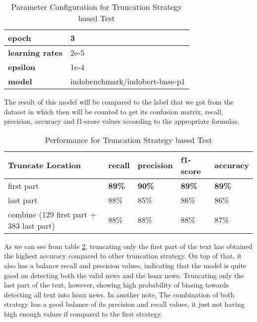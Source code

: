 \begin{table}[h]
  \caption{Parameter Configuration for Truncation Strategy based Test}
  \label{tab: truncate_param}
  \centering
  \begin{tabular}{|l|l|}
    \hline
    \textbf{epoch}          & 3                              \\ \hline
    \textbf{learning rates} & 2e-5                           \\ \hline
    \textbf{epsilon}        & 1e-4                           \\ \hline
    \textbf{model}          & indobenchmark/indobert-base-p1 \\ \hline
  \end{tabular}
\end{table}

The result of this model will be compared to the label that we got from the dataset in which then will be counted to get its confusion matrix, recall, precision, accuracy and f1-score values according to the appropriate formulas.

\begin{table}[h]
  \centering
  \caption{Performance for Truncation Strategy based Test}
  \label{tab: truncate_result}
  \begin{tabular}{|p{}|l|l|l|l|}
    \hline
    \textbf{Truncate Location}               & \textbf{recall} & \textbf{precision} & \textbf{f1-score} & \textbf{accuracy} \\ \hline
    first part                               & \textbf{89\%}   & \textbf{90\%}      & \textbf{89\%}     & \textbf{89\%}     \\ \hline
    last part                                & 88\%            & 85\%               & 86\%              & 86\%              \\ \hline
    combine (129 first part + 383 last part) & 88\%            & 88\%               & 88\%              & 87\%              \\ \hline
  \end{tabular}
\end{table}

As we can see from table \ref{tab: truncate_result}, truncating only the first part of the text has obtained the highest accuracy compared to other truncation strategy. On top of that, it also has a balance recall and precision values, indicating that the model is quite good on detecting both the valid news and the hoax news. Truncating only the last part of the text, however, showing high probability of biasing towards detecting all text into hoax news. In another note, The combination of both strategy has a good balance of its precision and recall values, it just not having high enough values if compared to the first strategy.

